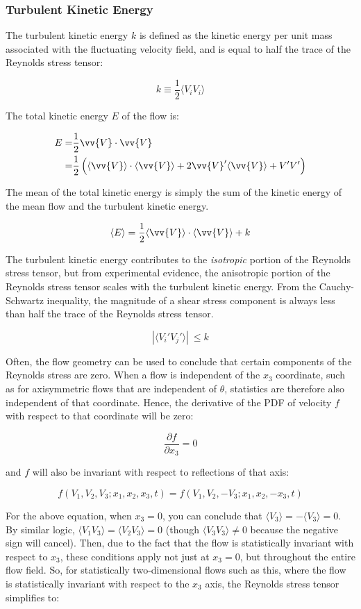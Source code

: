\documentclass[10pt]{article}
\newcommand{\beq}{\begin{equation}}
\newcommand{\eeq}{\end{equation}}
\newcommand{\beqa}{\begin{equation}\begin{aligned}}
\newcommand{\eeqa}{\end{aligned}\end{equation}}
\newcommand{\la}{\langle}
\newcommand{\ra}{\rangle}
\newcounter{subsubsubsection}[subsubsection]
\begin{document}
\begin{flushleft}
\subsubsection{Turbulent Kinetic Energy}

The turbulent kinetic energy \(k\) is defined as the kinetic energy per unit mass associated with the fluctuating velocity field, and is equal to half the trace of the Reynolds stress tensor:

\beq
\label{eq:turbenergy}
k\equiv\frac{1}{2}\la V_iV_i\ra
\eeq

The total kinetic energy \(E\) of the flow is:

\beqa
E=&\frac{1}{2}\vv{V}\cdot\vv{V}\\
=& \frac{1}{2}\left(\la\vv{V}\ra\cdot\la\vv{V}\ra+2\vv{V}'\la\vv{V}\ra+V'V'\right)
\eeqa

The mean of the total kinetic energy is simply the sum of the kinetic energy of the mean flow and the turbulent kinetic energy. 

\beq
\la E\ra=\frac{1}{2}\la\vv{V}\ra\cdot\la\vv{V}\ra+k
\eeq

The turbulent kinetic energy contributes to the \textit{isotropic} portion of the Reynolds stress tensor, but from experimental evidence, the anisotropic portion of the Reynolds stress tensor scales with the turbulent kinetic energy. From the Cauchy-Schwartz inequality, the magnitude of a shear stress component is always less than half the trace of the Reynolds stress tensor. 

\beq
|\la V_i'V_j'\ra|\ \leq k
\eeq





Often, the flow geometry can be used to conclude that certain components of the Reynolds stress are zero. When a flow is independent of the \(x_3\) coordinate, such as for axisymmetric flows that are independent of \(\theta\), statistics are therefore also independent of that coordinate. Hence, the derivative of the PDF of velocity \(f\) with respect to that coordinate will be zero:

\beq
\frac{\partial f}{\partial x_3}=0
\eeq

and \(f\) will also be invariant with respect to reflections of that axis:

\beq
f(V_1,V_2,V_3; x_1,x_2,x_3,t)=f(V_1,V_2,-V_3;x_1,x_2,-x_3,t)
\eeq

For the above equation, when \(x_3=0\), you can conclude that \(\la V_3\ra=-\la V_3\ra=0\). By similar logic, \(\la V_1V_3\ra=\la V_2V_3\ra=0\) (though \(\la V_3V_3\ra\neq0\) because the negative sign will cancel). Then, due to the fact that the flow is statistically invariant with respect to \(x_3\), these conditions apply not just at \(x_3=0\), but throughout the entire flow field. So, for statistically two-dimensional flows such as this, where the flow is statistically invariant with respect to the \(x_3\) axis, the Reynolds stress tensor simplifies to:


\end{flushleft}
\end{document}
